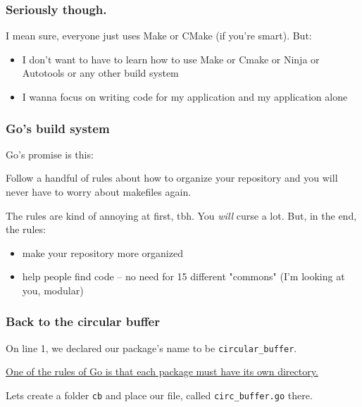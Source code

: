 \documentclass{beamer}
\begin{document}
\begin{frame}
\frametitle{Seriously though.}

I mean sure, everyone just uses Make or CMake (if you're smart). But:
\vspace{1cm}

\begin{itemize}
\setlength\itemsep{2em}
\item I don't want to have to learn how to use Make or Cmake or Ninja or Autotools or any other build system
\item I wanna focus on writing code for my application and my application alone
\end{itemize}

\end{frame}

\begin{frame}
\frametitle{Go's build system}

Go's promise is this:

\vspace{1.5cm}

Follow a handful of rules about how to organize your repository and you will never have to worry about makefiles again.
\vspace{1cm}

The rules are kind of annoying at first, tbh. You \textit{will} curse a lot. But, in the end, the rules:

\begin{itemize}
\item make your repository more organized
\item help people find code -- no need for 15 different "commons" (I'm looking at you, modular)
\end{itemize}

\end{frame}

\begin{frame}[fragile]
\frametitle{Back to the circular buffer}

On line 1, we declared our package's name to be \texttt{circular\_buffer}.
\vspace{1cm}

\underline{One of the rules of Go is that each package must have its own directory.} 

\vspace{1cm}

Lets create a folder \texttt{cb} and place our file, called \texttt{circ\_buffer.go} there.


\end{frame}
\end{document}
